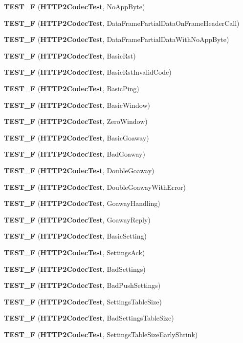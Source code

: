 \begin{DoxyCompactItemize}
{\bf T\+E\+S\+T\+\_\+F} ({\bf H\+T\+T\+P2\+Codec\+Test}, No\+App\+Byte)
\item 
{\bf T\+E\+S\+T\+\_\+F} ({\bf H\+T\+T\+P2\+Codec\+Test}, Data\+Frame\+Partial\+Data\+On\+Frame\+Header\+Call)
\item 
{\bf T\+E\+S\+T\+\_\+F} ({\bf H\+T\+T\+P2\+Codec\+Test}, Data\+Frame\+Partial\+Data\+With\+No\+App\+Byte)
\item 
{\bf T\+E\+S\+T\+\_\+F} ({\bf H\+T\+T\+P2\+Codec\+Test}, Basic\+Rst)
\item 
{\bf T\+E\+S\+T\+\_\+F} ({\bf H\+T\+T\+P2\+Codec\+Test}, Basic\+Rst\+Invalid\+Code)
\item 
{\bf T\+E\+S\+T\+\_\+F} ({\bf H\+T\+T\+P2\+Codec\+Test}, Basic\+Ping)
\item 
{\bf T\+E\+S\+T\+\_\+F} ({\bf H\+T\+T\+P2\+Codec\+Test}, Basic\+Window)
\item 
{\bf T\+E\+S\+T\+\_\+F} ({\bf H\+T\+T\+P2\+Codec\+Test}, Zero\+Window)
\item 
{\bf T\+E\+S\+T\+\_\+F} ({\bf H\+T\+T\+P2\+Codec\+Test}, Basic\+Goaway)
\item 
{\bf T\+E\+S\+T\+\_\+F} ({\bf H\+T\+T\+P2\+Codec\+Test}, Bad\+Goaway)
\item 
{\bf T\+E\+S\+T\+\_\+F} ({\bf H\+T\+T\+P2\+Codec\+Test}, Double\+Goaway)
\item 
{\bf T\+E\+S\+T\+\_\+F} ({\bf H\+T\+T\+P2\+Codec\+Test}, Double\+Goaway\+With\+Error)
\item 
{\bf T\+E\+S\+T\+\_\+F} ({\bf H\+T\+T\+P2\+Codec\+Test}, Goaway\+Handling)
\item 
{\bf T\+E\+S\+T\+\_\+F} ({\bf H\+T\+T\+P2\+Codec\+Test}, Goaway\+Reply)
\item 
{\bf T\+E\+S\+T\+\_\+F} ({\bf H\+T\+T\+P2\+Codec\+Test}, Basic\+Setting)
\item 
{\bf T\+E\+S\+T\+\_\+F} ({\bf H\+T\+T\+P2\+Codec\+Test}, Settings\+Ack)
\item 
{\bf T\+E\+S\+T\+\_\+F} ({\bf H\+T\+T\+P2\+Codec\+Test}, Bad\+Settings)
\item 
{\bf T\+E\+S\+T\+\_\+F} ({\bf H\+T\+T\+P2\+Codec\+Test}, Bad\+Push\+Settings)
\item 
{\bf T\+E\+S\+T\+\_\+F} ({\bf H\+T\+T\+P2\+Codec\+Test}, Settings\+Table\+Size)
\item 
{\bf T\+E\+S\+T\+\_\+F} ({\bf H\+T\+T\+P2\+Codec\+Test}, Bad\+Settings\+Table\+Size)
\item 
{\bf T\+E\+S\+T\+\_\+F} ({\bf H\+T\+T\+P2\+Codec\+Test}, Settings\+Table\+Size\+Early\+Shrink)
\item 

\end{DoxyCompactItemize}
